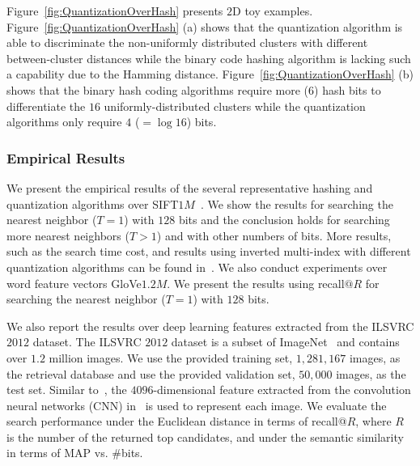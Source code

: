 \documentclass[10pt,journal,compsoc]{IEEEtran}
\begin{document}
Figure~\ref{fig:QuantizationOverHash} presents
$2$D toy examples.
Figure~\ref{fig:QuantizationOverHash} (a) shows
that the quantization algorithm is able to
discriminate the non-uniformly distributed clusters
with different between-cluster distances
while the binary code hashing algorithm is lacking such a capability
due to the Hamming distance.
Figure~\ref{fig:QuantizationOverHash} (b)
shows that the binary hash coding algorithms require
more ($6$) hash bits to differentiate the $16$ uniformly-distributed clusters
while the quantization algorithms only require $4$ ($= \log 16 $) bits.



\subsubsection{Empirical Results}
We present the empirical results of the several representative hashing and quantization algorithms
over SIFT$1M$~\cite{JegouDS11}.
We show the results for searching the nearest neighbor ($T=1$)
with $128$ bits
and the conclusion holds for searching more nearest neighbors ($T>1$)
and with other numbers of bits.
More results, such as the search time cost,
and results using inverted multi-index with different quantization algorithms
can be found in~\cite{ZhangQTW15}.
We also conduct experiments over
word feature vectors GloVe$1.2M$.
We present the results using
recall$@R$ for searching the nearest neighbor ($T=1$)
with $128$ bits.

We also report the results over deep learning features
extracted from the ILSVRC $2012$ dataset.
The ILSVRC $2012$ dataset is a subset of ImageNet~\cite{deng2009imagenet} and contains over $1.2$ million images.
We use the provided training set, $1,281,167$ images, as the retrieval database
and {use the provided validation set, $50,000$ images, as the test set}.
Similar to~\cite{ShenSLS15}, the $4096$-dimensional feature
extracted from the convolution neural networks (CNN)
in~\cite{krizhevsky2012imagenet} is used to represent each image.
We evaluate the search performance under the Euclidean distance
in terms of recall@$R$, where $R$ is the number of the returned top candidates,
and under the semantic similarity in terms of MAP vs. $\#$bits.
\end{document}
